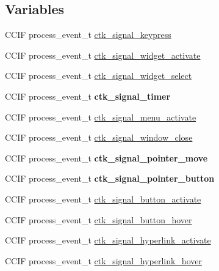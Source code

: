 \subsection*{Variables}
\begin{DoxyCompactItemize}
\item 
C\+C\+I\+F process\+\_\+event\+\_\+t \hyperlink{group__ctkappfunc_ga402ef668c2e4a1ba24e7dff9d8b8d82c}{ctk\+\_\+signal\+\_\+keypress}
\item 
C\+C\+I\+F process\+\_\+event\+\_\+t \hyperlink{group__ctkappfunc_ga277f650dd55185e3f451a6dbe91701aa}{ctk\+\_\+signal\+\_\+widget\+\_\+activate}
\item 
C\+C\+I\+F process\+\_\+event\+\_\+t \hyperlink{group__ctkappfunc_ga6d9f0f4b1f9361038433a4201fa1959e}{ctk\+\_\+signal\+\_\+widget\+\_\+select}
\item 
\hypertarget{group__ctkappfunc_ga2b7be51431c73787987fbbb9c338c1bc}{}C\+C\+I\+F process\+\_\+event\+\_\+t {\bfseries ctk\+\_\+signal\+\_\+timer}\label{group__ctkappfunc_ga2b7be51431c73787987fbbb9c338c1bc}

\item 
C\+C\+I\+F process\+\_\+event\+\_\+t \hyperlink{group__ctkappfunc_gab42f0dd069d79854b05a7da8390b8e6f}{ctk\+\_\+signal\+\_\+menu\+\_\+activate}
\item 
C\+C\+I\+F process\+\_\+event\+\_\+t \hyperlink{group__ctkappfunc_ga8d7e716617b14bdd39c9bc3580c9cf4f}{ctk\+\_\+signal\+\_\+window\+\_\+close}
\item 
\hypertarget{group__ctkappfunc_gaf0199aab82041794b5a8ecb1c561cfb5}{}C\+C\+I\+F process\+\_\+event\+\_\+t {\bfseries ctk\+\_\+signal\+\_\+pointer\+\_\+move}\label{group__ctkappfunc_gaf0199aab82041794b5a8ecb1c561cfb5}

\item 
\hypertarget{group__ctkappfunc_gacd04843f62a2f8a32d39073796a4fb38}{}C\+C\+I\+F process\+\_\+event\+\_\+t {\bfseries ctk\+\_\+signal\+\_\+pointer\+\_\+button}\label{group__ctkappfunc_gacd04843f62a2f8a32d39073796a4fb38}

\item 
C\+C\+I\+F process\+\_\+event\+\_\+t \hyperlink{group__ctkappfunc_gaa2bc506111007602e645da602d2b7118}{ctk\+\_\+signal\+\_\+button\+\_\+activate}
\item 
C\+C\+I\+F process\+\_\+event\+\_\+t \hyperlink{group__ctkappfunc_ga1052b7e5e2dc81a75ccbec1bff09692f}{ctk\+\_\+signal\+\_\+button\+\_\+hover}
\item 
C\+C\+I\+F process\+\_\+event\+\_\+t \hyperlink{group__ctkappfunc_gadc5e543e59549910cc5029d6aca44583}{ctk\+\_\+signal\+\_\+hyperlink\+\_\+activate}
\item 
C\+C\+I\+F process\+\_\+event\+\_\+t \hyperlink{group__ctkappfunc_ga80c232151cb34706298858aaf343ae64}{ctk\+\_\+signal\+\_\+hyperlink\+\_\+hover}
\end{DoxyCompactItemize}


